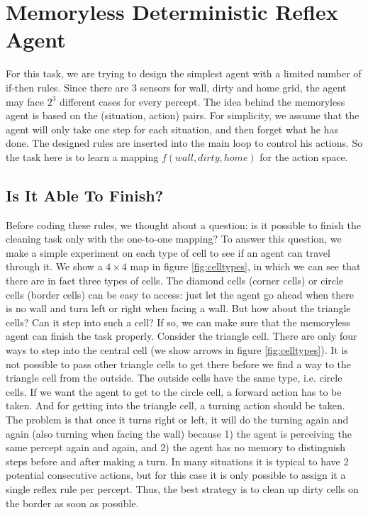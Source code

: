 \section{Memoryless Deterministic Reflex Agent}
For this task, we are trying to design the simplest agent with a limited number of if-then rules. Since there are 3 sensors for wall, dirty and home grid, the agent may face $2^3$ different cases for every percept. The idea behind the memoryless agent is based on the (situation, action) pairs. For simplicity, we assume that the agent will only take one step for each situation, and then forget what he has done. The designed rules are inserted into the main loop to control his actions. So the task here is to learn a mapping $f(wall, dirty, home)$ for the action space.   

\subsection{Is It Able To Finish?}
Before coding these rules, we thought about a question: is it possible to finish the cleaning task only with the one-to-one mapping? To answer this question, we make a simple experiment on each type of cell to see if an agent can travel through it. We show a $4 \times 4$ map in figure \ref{fig:celltypes}, in which we can see that there are in fact three types of cells. The diamond cells (corner cells) or circle cells (border cells) can be easy to access: just let the agent go ahead when
there is no wall and turn left or right when facing a wall. But how about the triangle cells? Can it step into such a cell? If so, we can make sure that the memoryless agent can finish the task properly. Consider the triangle cell. There are only four ways to step into the central cell (we show arrows in figure \ref{fig:celltypes}). It is not possible to pass other triangle cells to get there before we find a way to the triangle cell from the outside. The outside cells have the same type, i.e.
circle cells. If we want the agent to get to the circle cell, a forward action has to be taken. And for getting into the triangle cell, a turning action should be taken. The problem is that once it turns right or left, it will do the turning again and again (also turning when facing the wall) because 1) the agent is perceiving the same percept again and again, and 2) the agent has no memory to distinguish steps before and after making a turn. In many situations it is typical to have 2 potential consecutive actions, but for this case it is only possible to assign it a single reflex rule per percept. Thus, the best strategy is to
clean up dirty cells on the border as soon as possible.


